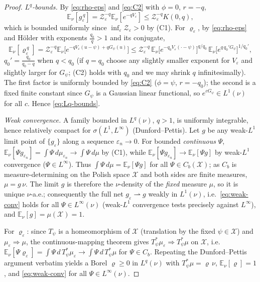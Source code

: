 \documentclass[12pt]{article}
\newcommand{\bE}{\mathbb{E}}
\newcommand{\eps}{\varepsilon}
\theoremstyle{plain}
\theoremstyle{definition}
\begin{document}
\begin{proof}
\emph{$L^q$-bounds.} By \eqref{eq:rho-eps} and \eqref{eq:C2} with $\phi=0$, $r=-q$,
\[
\bE_\nu[g_\eps^{\,q}]=\mathcal Z_\eps^{-q}\bE_\nu[e^{-qV_\eps}]\le \mathcal Z_\eps^{-q}K(0,q),
\]
which is bounded uniformly since $\inf_\eps\mathcal Z_\eps>0$ by (C1). For $\varrho_\eps$,
by \eqref{eq:rho-eps} and H\"older with exponents $\tfrac{q_0}{q}>1$ and its conjugate,
\[
\bE_\nu[\varrho_\eps^{\,q}]
=\mathcal Z_\eps^{-q}\bE_\nu\!\big[e^{-qV_\eps(u-\psi)+qG_\psi(u)}\big]
\le \mathcal Z_\eps^{-q}\,\bE_\nu\!\big[e^{-q_0 V_\eps(\cdot-\psi)}\big]^{q/q_0}
\,\bE_\nu\!\big[e^{q\,q_0' G_\psi}\big]^{1/q_0'},
\]
$q_0'=\tfrac{q_0}{q_0-q}$ when $q<q_0$ (if $q=q_0$ choose any slightly smaller exponent
for $V_\eps$ and slightly larger for $G_\psi$; (C2) holds with $q_0$ and we may shrink
$q$ infinitesimally). The first factor is uniformly bounded by \eqref{eq:C2}
($\phi=\psi$, $r=-q_0$); the second is a fixed finite constant since $G_\psi$ is a
Gaussian linear functional, so $e^{cG_\psi}\in L^1(\nu)$ for all $c$. Hence
\eqref{eq:Lq-bounds}.

\emph{Weak convergence.} A family bounded in $L^q(\nu)$, $q>1$, is uniformly integrable,
hence relatively compact for $\sigma(L^1,L^\infty)$ (Dunford--Pettis). Let $g$ be any
weak-$L^1$ limit point of $\{g_\eps\}$ along a sequence $\eps_n\to0$. For bounded
\emph{continuous} $\Psi$, $\bE_\nu[\Psi g_{\eps_n}]=\int\Psi\,d\mu_{\eps_n}\to\int\Psi\,d\mu$
by (C1), while $\bE_\nu[\Psi g_{\eps_n}]\to\bE_\nu[\Psi g]$ by weak-$L^1$ convergence
($\Psi\in L^\infty$). Thus $\int\Psi\,d\mu=\bE_\nu[\Psi g]$ for all $\Psi\in C_b(\mathcal X)$;
as $C_b$ is measure-determining on the Polish space $\mathcal X$ and both sides are
finite measures, $\mu=g\,\nu$. The limit $g$ is therefore the $\nu$-density of the
\emph{fixed} measure $\mu$, so it is unique $\nu$-a.e.; consequently the full net
$g_\eps\rightharpoonup g$ weakly in $L^1(\nu)$, i.e.\ \eqref{eq:weak-conv} holds for all
$\Psi\in L^\infty(\nu)$ (weak-$L^1$ convergence tests precisely against $L^\infty$),
and $\bE_\nu[g]=\mu(\mathcal X)=1$.

For $\varrho_\eps$: since $T_\psi$ is a homeomorphism of $\mathcal X$ (translation by the
fixed $\psi\in\mathcal X$) and $\mu_\eps\Rightarrow\mu$, the continuous-mapping theorem
gives $T_\psi^\ast\mu_\eps\Rightarrow T_\psi^\ast\mu$ on $\mathcal X$, i.e.\
$\bE_\nu[\Psi\varrho_\eps]=\int\Psi\,d\,T_\psi^\ast\mu_\eps\to\int\Psi\,d\,T_\psi^\ast\mu$
for $\Psi\in C_b$. Repeating the Dunford--Pettis argument verbatim yields a Borel
$\varrho\ge0$ in $L^q(\nu)$ with $T_\psi^\ast\mu=\varrho\,\nu$, $\bE_\nu[\varrho]=1$, and
\eqref{eq:weak-conv} for all $\Psi\in L^\infty(\nu)$.
\end{proof}
\end{document}
